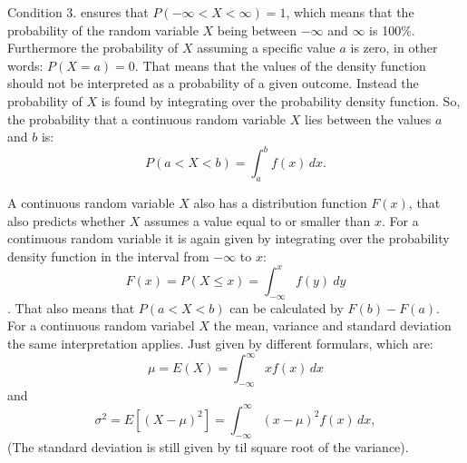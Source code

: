 Condition 3. ensures that $P(-\infty < X < \infty) = 1$, which means that the probability of the random variable $X$ being between $-\infty$ and $\infty$ is 100\%. Furthermore the probability of $X$ assuming a specific value $a$ is zero, in other words: $P(X=a)=0$. That means that the values of the density function should not be interpreted as a probability of a given outcome. Instead the probability of $X$ is found by integrating over the probability density function. So, the probability that a continuous random variable $X$ lies between the values $a$ and $b$ is: 
$$P(a < X < b) = \int_a^b f(x) \, dx.$$

A continuous random variable $X$ also has a distribution function $F(x)$, that also predicts whether $X$ assumes a value equal to or smaller than $x$. For a continuous random variable it is again given by integrating over the probability density function in the interval from $-\infty$ to $x$:
$$F(x) = P(X \leq x) = \int_{-\infty}^{x} f(y) \ dy$$.
That also means that $P(a<X<b)$ can be calculated by $F(b)-F(a)$.
\\

For a continuous random variabel $X$ the mean, variance and standard deviation the same interpretation applies. Just given by different formulars, which are:
$$\mu = E(X) = \int_{-\infty}^{\infty} x f(x) \, dx$$
and
$$\sigma^2 = E\left[(X - \mu)^2\right] = \int_{-\infty}^{\infty} (x - \mu)^2 f(x) \, dx,$$
(The standard deviation is still given by til square root of the variance).

